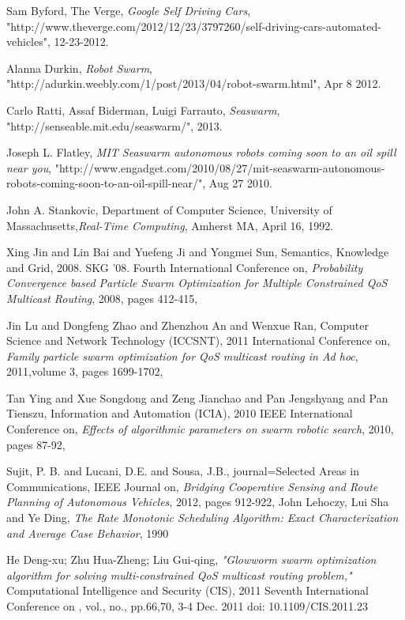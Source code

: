 \documentclass[journal]{IEEEtran}
\begin{document}
\ifCLASSOPTIONcaptionsoff
  \newpage
\fi
\begin{thebibliography}{1}

Sam Byford, The Verge, \emph{Google Self Driving Cars}, "http://www.theverge.com/2012/12/23/3797260/self-driving-cars-automated-vehicles", 12-23-2012.

Alanna Durkin, \emph{Robot Swarm}, "http://adurkin.weebly.com/1/post/2013/04/robot-swarm.html", Apr 8 2012.

Carlo Ratti, Assaf Biderman, Luigi Farrauto, \emph{Seaswarm}, "http://senseable.mit.edu/seaswarm/", 2013.

Joseph L. Flatley, \emph{MIT Seaswarm autonomous robots coming soon to an oil spill near you},
"http://www.engadget.com/2010/08/27/mit-seaswarm-autonomous-robots-coming-soon-to-an-oil-spill-near/", Aug 27 2010.

John A. Stankovic, Department of Computer Science, University of Massachusetts,\emph{Real-Time Computing}, Amherst MA, April 16, 1992.

Xing Jin and Lin Bai and Yuefeng Ji and Yongmei Sun,
Semantics, Knowledge and Grid, 2008. SKG '08. Fourth International Conference on, \emph{Probability Convergence based Particle Swarm Optimization for Multiple Constrained QoS Multicast Routing},
2008, pages 412-415,

Jin Lu and Dongfeng Zhao and Zhenzhou An and Wenxue Ran,
Computer Science and Network Technology (ICCSNT), 2011 International Conference on, \emph{Family particle swarm optimization for QoS multicast routing in Ad hoc},
2011,volume 3, pages 1699-1702,

Tan Ying and Xue Songdong and Zeng Jianchao and Pan Jengshyang and Pan Tienszu,
Information and Automation (ICIA), 2010 IEEE International Conference on, \emph{Effects of algorithmic parameters on swarm robotic search},
2010, pages 87-92,

Sujit, P. B. and Lucani, D.E. and Sousa, J.B.,
journal=Selected Areas in Communications, IEEE Journal on, \emph{Bridging Cooperative Sensing and Route Planning of Autonomous Vehicles},
2012, pages 912-922,
John Lehoczy, Lui Sha and Ye Ding,
\emph{The Rate Monotonic Scheduling Algorithm: Exact Characterization and Average Case Behavior},
1990

He Deng-xu; Zhu Hua-Zheng; Liu Gui-qing, \emph{"Glowworm swarm optimization algorithm for solving multi-constrained QoS multicast routing problem,"} Computational Intelligence and Security (CIS), 2011 Seventh International Conference on , vol., no., pp.66,70, 3-4 Dec. 2011
doi: 10.1109/CIS.2011.23


\end{thebibliography}
\end{document}
